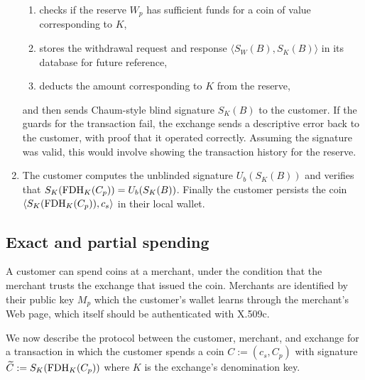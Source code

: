 \documentclass[sigconf, authordraft]{acmart}
\begin{document}
\begin{enumerate}
    \begin{enumerate}
      \item checks if the reserve $W_p$ has sufficient funds
            for a coin of value corresponding to $K$,
      \item stores the withdrawal request and response
            $\langle S_W(B), S_K(B) \rangle$ in its database
            for future reference,
      \item deducts the amount corresponding to $K$ from the reserve,
    \end{enumerate}
    and then sends Chaum-style blind signature $S_K(B)$ to the customer.
    If the guards for the transaction fail, the exchange sends a descriptive
    error back to the customer, with proof that it operated correctly.
    Assuming the signature was valid, this would involve showing the transaction
    history for the reserve.
  \item The customer computes the unblinded signature $U_b(S_K(B))$ and
    verifies that $S_K(\textrm{FDH}_K(C_p)) = U_b(S_K(B))$.
    Finally the customer persists the coin $\langle S_K(\textrm{FDH}_K(C_p)), c_s \rangle$
    in their local wallet.
\end{enumerate}


\subsection{Exact and partial spending}

A customer can spend coins at a merchant, under the condition that the
merchant trusts the exchange that issued the coin.
Merchants are identified by their public key $M_p$ which the
customer's wallet learns through the merchant's Web page, which itself
should be authenticated with X.509c.

We now describe the protocol between the customer, merchant, and exchange
for a transaction in which the customer spends a coin $C := (c_s, C_p)$
with signature $\widetilde{C} := S_K(\textrm{FDH}_K(C_p))$
 where $K$ is the exchange's denomination key.

\end{document}
